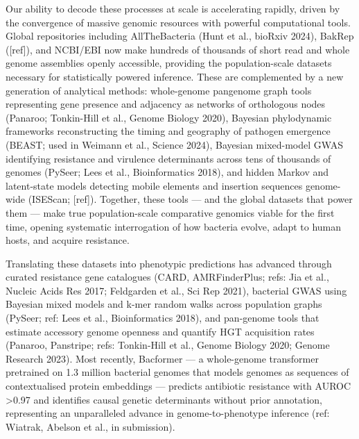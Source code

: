 \documentclass{article}
\begin{document}
Our ability to decode these processes at scale is accelerating rapidly, driven by the convergence of massive genomic resources with powerful computational tools. Global repositories including AllTheBacteria (Hunt et al., bioRxiv 2024), BakRep ([ref]), and NCBI/EBI now make hundreds of thousands of short read and whole genome assemblies openly accessible, providing the population-scale datasets necessary for statistically powered inference. These are complemented by a new generation of analytical methods: whole-genome pangenome graph tools representing gene presence and adjacency as networks of orthologous nodes (Panaroo; Tonkin-Hill et al., Genome Biology 2020), Bayesian phylodynamic frameworks reconstructing the timing and geography of pathogen emergence (BEAST; used in Weimann et al., Science 2024), Bayesian mixed-model GWAS identifying resistance and virulence determinants across tens of thousands of genomes (PySeer; Lees et al., Bioinformatics 2018), and hidden Markov and latent-state models detecting mobile elements and insertion sequences genome-wide (ISEScan; [ref]). Together, these tools — and the global datasets that power them — make true population-scale comparative genomics viable for the first time, opening systematic interrogation of how bacteria evolve, adapt to human hosts, and acquire resistance.

Translating these datasets into phenotypic predictions has advanced through curated resistance gene catalogues (CARD, AMRFinderPlus; refs: Jia et al., Nucleic Acids Res 2017; Feldgarden et al., Sci Rep 2021), bacterial GWAS using Bayesian mixed models and k-mer random walks across population graphs (PySeer; ref: Lees et al., Bioinformatics 2018), and pan-genome tools that estimate accessory genome openness and quantify HGT acquisition rates (Panaroo, Panstripe; refs: Tonkin-Hill et al., Genome Biology 2020; Genome Research 2023). Most recently, Bacformer — a whole-genome transformer pretrained on 1.3 million bacterial genomes that models genomes as sequences of contextualised protein embeddings — predicts antibiotic resistance with AUROC >0.97 and identifies causal genetic determinants without prior annotation, representing an unparalleled advance in genome-to-phenotype inference (ref: Wiatrak, Abelson et al., in submission).
 
\end{document}
